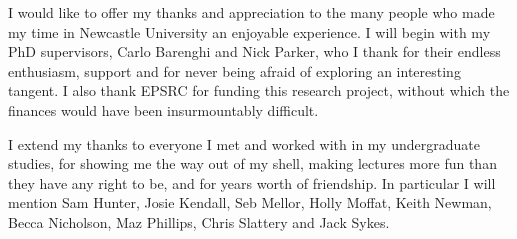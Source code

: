 \begin{acknowledgements}
 I would like to offer my thanks and appreciation to the many people who made my time in Newcastle University an enjoyable experience. I will begin with my PhD supervisors, Carlo Barenghi and Nick Parker, who I thank for their endless enthusiasm, support and for never being afraid of exploring an interesting tangent. I also thank EPSRC for funding this research project, without which the finances would have been insurmountably difficult.

 I extend my thanks to everyone I met and worked with in my undergraduate studies, for showing me the way out of my shell, making lectures more fun than they have any right to be, and for years worth of friendship. In particular I will mention Sam Hunter, 
 Josie Kendall, Seb Mellor, Holly Moffat, Keith Newman, Becca Nicholson, Maz Phillips, Chris Slattery and Jack Sykes.
\end{acknowledgements}
\thispagestyle{empty}
